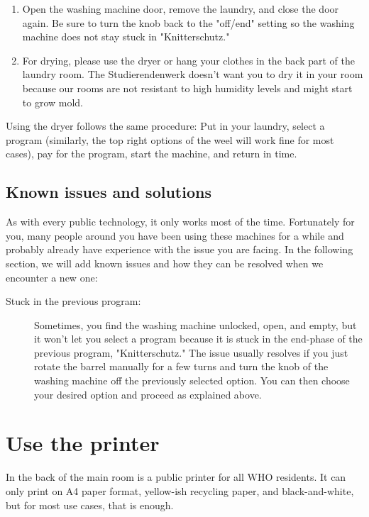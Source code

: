 \begin{enumerate}
    \item Open the washing machine door, remove the laundry, and close the door again. Be sure to turn the knob back to the "off/end" setting so the washing machine does not stay stuck in "Knitterschutz."    
    
    \item For drying, please use the dryer or hang your clothes in the back part of the laundry room. The Studierendenwerk doesn't want you to dry it in your room because our rooms are not resistant to high humidity levels and might start to grow mold.
\end{enumerate}

Using the dryer follows the same procedure: Put in your laundry, select a program (similarly, the top right options of the weel will work fine for most cases), pay for the program, start the machine, and return in time.

\subsection{Known issues and solutions}
As with every public technology, it only works most of the time. Fortunately for you, many people around you have been using these machines for a while and probably already have experience with the issue you are facing. In the following section, we will add known issues and how they can be resolved when we encounter a new one:
\begin{description}
    \item[Stuck in the previous program:] Sometimes, you find the washing machine unlocked, open, and empty, but it won't let you select a program because it is stuck in the end-phase of the previous program, "Knitterschutz." The issue usually resolves if you just rotate the barrel manually for a few turns and turn the knob of the washing machine off the previously selected option. You can then choose your desired option and proceed as explained above.
\end{description}

\section{Use the printer}
In the back of the main room is a public printer for all WHO residents. It can only print on A4 paper format, yellow-ish recycling paper, and black-and-white, but for most use cases, that is enough.

